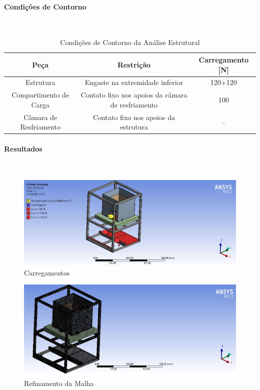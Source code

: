 \paragraph*{Condições de Contorno}\
\begin{table}[H]
\centering
\caption{Condições de Contorno da Análise Estrutural}
\label{condcontornoestrut}
\begin{tabular}{|c|c|c|}
\hline
Peça                   & Restrição                                         & Carregamento {[}N{]} \\ \hline
Estrutura              & Engaste na extremidade inferior                   & 120+120              \\ \hline
Compartimento de Carga & Contato fixo nos apoios da câmara de resfriamento & 100                  \\ \hline
Câmara de Resfriamento & Contato fixo nos apoios da estrutura              & --                   \\ \hline
\end{tabular}
\end{table}

\paragraph*{Resultados}\

\begin{figure}[H]
\centering
\includegraphics[width=16cm]{figuras/carregamentos.png}
\caption{Carregamentos}
\end{figure}

\begin{figure}[H]
\centering
\includegraphics[width=16cm]{figuras/malharefinada.png}
\caption{Refinamento da Malha}
\end{figure}

